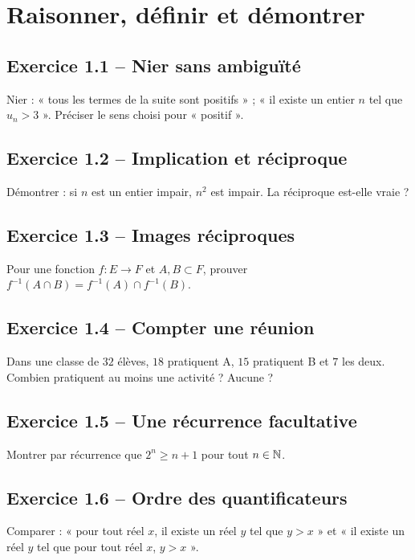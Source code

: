 \chapter{Raisonner, définir et démontrer}
\section*{Exercice 1.1 -- Nier sans ambiguïté}
Nier : « tous les termes de la suite sont positifs » ; « il existe un entier $n$ tel que $u_n>3$ ». Préciser le sens choisi pour « positif ».

\section*{Exercice 1.2 -- Implication et réciproque}
Démontrer : si $n$ est un entier impair, $n^2$ est impair. La réciproque est-elle vraie ?

\section*{Exercice 1.3 -- Images réciproques}
Pour une fonction $f:E\to F$ et $A,B\subset F$, prouver $f^{-1}(A\cap B)=f^{-1}(A)\cap f^{-1}(B)$.

\section*{Exercice 1.4 -- Compter une réunion}
Dans une classe de $32$ élèves, $18$ pratiquent A, $15$ pratiquent B et $7$ les deux. Combien pratiquent au moins une activité ? Aucune ?

\section*{Exercice 1.5 -- Une récurrence facultative}
Montrer par récurrence que $2^n\ge n+1$ pour tout $n\in\mathbb{N}$.

\section*{Exercice 1.6 -- Ordre des quantificateurs}
Comparer : « pour tout réel $x$, il existe un réel $y$ tel que $y>x$ » et « il existe un réel $y$ tel que pour tout réel $x$, $y>x$ ».
